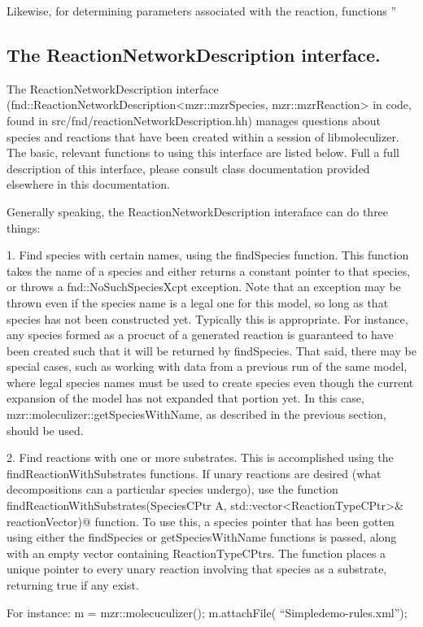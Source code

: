 Likewise, for determining parameters associated with the reaction,
functions ''

\subsection{The ReactionNetworkDescription interface.}
The ReactionNetworkDescription interface
(fnd::ReactionNetworkDescription<mzr::mzrSpecies, mzr::mzrReaction> in
code, found in src/fnd/reactionNetworkDescription.hh) manages questions
about species and reactions that have been created within a session of
libmoleculizer.  The basic, relevant functions to using this interface
are listed below.  Full a full description of this interface, please
consult class documentation provided elsewhere in this documentation.

Generally speaking, the ReactionNetworkDescription interaface can do
three things:

1.
Find species with certain names, using the findSpecies function.  This
function takes the name of a species and either returns a constant
pointer to that species, or throws a fnd::NoSuchSpeciesXcpt
exception.  Note that an exception may be thrown even if the species
name is a legal one for this model, so long as that species has not
been constructed yet.  Typically this is appropriate.  For instance,
any species formed as a procuct of a generated reaction is guaranteed
to have been created such that it will be returned by findSpecies.
That said, there may be special cases, such as working with data from
a previous run of the same model, where legal species names must be
used to create species even though the current expansion of the model
has not expanded that portion yet.  In this case,
mzr::moleculizer::getSpeciesWithName, as described in the previous
section, should be used.  

2.  Find reactions with one or more substrates.
This is accomplished using the findReactionWithSubstrates functions.
If unary reactions are desired (what decompositions can a particular
species undergo), use the function 
\lstinline@bool findReactionWithSubstrates(SpeciesCPtr A, std::vector<ReactionTypeCPtr>& reactionVector)@ function.  To use 
this, a species pointer that has been gotten using either the
findSpecies or getSpeciesWithName functions is passed, along with an
empty vector containing ReactionTypeCPtrs.  The function places a
unique pointer to every unary reaction involving that species as a
substrate, returning true if any exist.  

For instance:
m = mzr::molecuculizer();
m.attachFile( ``Simpledemo-rules.xml''); 

